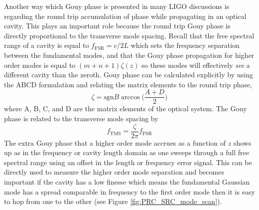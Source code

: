 		Another way which Gouy phase is presented in many LIGO discussions is regarding the round trip accumulation of phase while propagating in an optical cavity.  This plays an important role because the round trip Gouy phase is directly proportional to the transverse mode spacing.  Recall that the free spectral range of a cavity is equal to $f_{\text{FSR}} = c/2L$ which sets the frequency separation between the fundamental modes, and that the Gouy phase propagation for higher order modes is equal to $(m+n+1) \zeta(z)$ so these modes will effectively \textit{see} a different cavity than the zeroth.  Gouy phase can be calculated explicitly by using the ABCD formulation and relating the matrix elements to the round trip phase,
		\begin{equation}
		\zeta = \text{sgn} B \arccos \bigg( \frac{A+D}{2} \bigg)
		\end{equation}
		where A, B, C, and D are the matrix elements of the optical system.  The Gouy phase is related to the transverse mode spacing by
		\begin{equation}
		f_{\text{TMS}} = \frac{\zeta}{2 \pi} f_{\text{FSR}}
		\end{equation} 
		The extra Gouy phase that a higher order mode accrues as a function of $z$ shows up as in the frequency or cavity length domain as one sweeps through a full free spectral range using an offset in the length or frequency error signal.  This can be directly used to measure the higher order mode separation and becomes important if the cavity has a low finesse which means the fundamental Gaussian mode has a spread comparable in frequency to the first order mode then it is easy to hop from one to the other (see Figure \ref{fig:PRC_SRC_mode_scan}).
